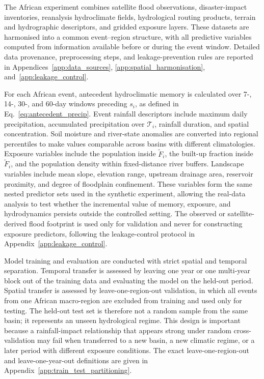 \documentclass[pdflatex,sn-mathphys-ay]{sn-jnl}
\theoremstyle{thmstyleone}
\theoremstyle{thmstylethree}
\theoremstyle{thmstyletwo}
\begin{document}
The African experiment combines satellite flood observations,
disaster-impact inventories, reanalysis hydroclimate fields,
hydrological routing products, terrain and hydrographic descriptors,
and gridded exposure layers.  These datasets are harmonised into a
common event--region structure, with all predictive variables computed
from information available before or during the event window.  Detailed
data provenance, preprocessing steps, and leakage-prevention rules are
reported in Appendices~\ref{app:data_sources},
\ref{app:spatial_harmonisation}, and~\ref{app:leakage_control}.

For each African event, antecedent hydroclimatic memory is calculated
over 7-, 14-, 30-, and 60-day windows preceding $s_i$, as defined in
Eq.~\eqref{eq:antecedent_precip}.  Event rainfall descriptors include
maximum daily precipitation, accumulated precipitation over
$\mathcal{T}_i$, rainfall duration, and spatial concentration.  Soil
moisture and river-state anomalies are converted into regional
percentiles to make values comparable across basins with different
climatologies.  Exposure variables include the population inside
$\widetilde{F}_i$, the built-up fraction inside $\widetilde{F}_i$, and
the population density within fixed-distance river buffers.  Landscape
variables include mean slope, elevation range, upstream drainage area,
reservoir proximity, and degree of floodplain confinement.  These
variables form the same nested predictor sets used in the synthetic
experiment, allowing the real-data analysis to test whether the
incremental value of memory, exposure, and hydrodynamics persists
outside the controlled setting.  The observed or satellite-derived
flood footprint is used only for validation and never for constructing
exposure predictors, following the leakage-control protocol in
Appendix~\ref{app:leakage_control}.

Model training and evaluation are conducted with strict spatial and
temporal separation.  Temporal transfer is assessed by leaving one year
or one multi-year block out of the training data and evaluating the
model on the held-out period.  Spatial transfer is assessed by
leave-one-region-out validation, in which all events from one African
macro-region are excluded from training and used only for testing.  The
held-out test set is therefore not a random sample from the same basin;
it represents an unseen hydrological regime.  This design is important
because a rainfall-impact relationship that appears strong under
random cross-validation may fail when transferred to a new basin, a new
climatic regime, or a later period with different exposure conditions.
The exact leave-one-region-out and leave-one-year-out definitions are
given in Appendix~\ref{app:train_test_partitioning}.
\end{document}
